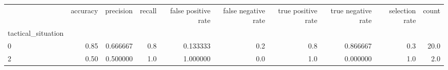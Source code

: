 \begin{tabular}{lrrrrrrrrr}
\toprule
{} &  accuracy &  precision &  recall &  false positive rate &  false negative rate &  true positive rate &  true negative rate &  selection rate &  count \\
tactical\_situation &           &            &         &                      &                      &                     &                     &                 &        \\
\midrule
0                  &      0.85 &   0.666667 &     0.8 &             0.133333 &                  0.2 &                 0.8 &            0.866667 &             0.3 &   20.0 \\
2                  &      0.50 &   0.500000 &     1.0 &             1.000000 &                  0.0 &                 1.0 &            0.000000 &             1.0 &    2.0 \\
\bottomrule
\end{tabular}
